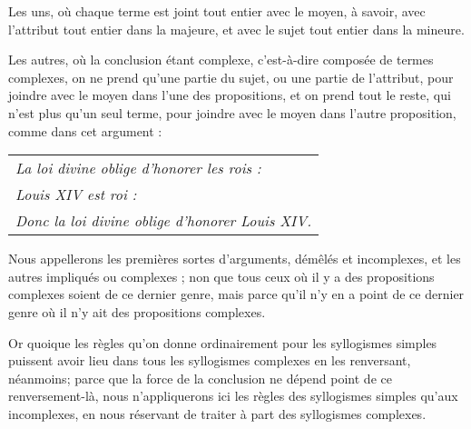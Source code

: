 Les uns, où chaque terme est joint tout entier avec le moyen, à savoir, avec l'attribut tout entier dans la majeure, et avec le sujet tout entier dans la mineure.

Les autres, où la conclusion étant complexe, c'est-à-dire composée de termes complexes, on ne prend qu'une partie du sujet, ou une partie de l'attribut, pour joindre avec le moyen dans l'une des propositions, et on prend tout le reste, qui n'est plus qu'un seul terme, pour joindre avec le moyen dans l'autre proposition, comme dans cet argument :
\begin{center}
	\begin{tabular}{l}
		\emph{La loi divine oblige d'honorer les rois :} \\
		\emph{Louis XIV est roi :} \\
		\emph{Donc la loi divine oblige d'honorer Louis XIV.} \\
	\end{tabular}
\end{center}

Nous appellerons les premières sortes d'arguments, démêlés et incomplexes, et les autres impliqués ou complexes ; non que tous ceux où il y a des propositions complexes soient de ce dernier genre, mais parce qu'il n'y en a point de ce dernier genre où il n'y ait des propositions complexes.

Or quoique les règles qu'on donne ordinairement pour les syllogismes simples puissent avoir lieu dans tous les syllogismes complexes en les renversant, néanmoins; parce que la force de la conclusion ne dépend point de ce renversement-là, nous n'appliquerons ici les règles des syllogismes simples qu'aux incomplexes, en nous réservant de traiter à part des syllogismes complexes.
